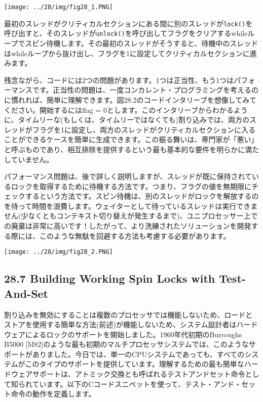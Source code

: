 \texttt{[image: ../28/img/fig28\_1.PNG]}

最初のスレッドがクリティカルセクションにある間に別のスレッドが\texttt{lock()}を呼び出すと、そのスレッドが\texttt{unlock()}を呼び出してフラグをクリアするwhileループでスピン待機します。その最初のスレッドがそうすると、待機中のスレッドはwhileループから抜け出し、フラグを1に設定してクリティカルセクションに進みます。

残念ながら、コードには2つの問題があります。1つは正当性、もう1つはパフォーマンスです。正当性の問題は、一度コンカレント・プログラミングを考えるのに慣れれば、簡単に理解できます。図28.2のコードインタリーブを想像してみてください。開始するにはflag
=
0とします。このインタリーブからわかるように、タイムリーな(もしくは、タイムリーではなくても)割り込みでは、両方のスレッドがフラグを1に設定し、両方のスレッドがクリティカルセクションに入ることができるケースを簡単に生成できます。この振る舞いは、専門家が「悪い」と呼ぶものであり、相互排除を提供するという最も基本的な要件を明らかに満たしていません。

パフォーマンス問題は、後で詳しく説明しますが、スレッドが既に保持されているロックを取得するために待機する方法です。つまり、フラグの値を無期限にチェックするという方法です。スピン待機は、別のスレッドがロックを解放するのを待って時間を浪費します。ウェイターとして待っているスレッドは実行できません(少なくともコンテキスト切り替えが発生するまで)、ユニプロセッサー上での廃棄は非常に高いです！したがって、より洗練されたソリューションを開発する際には、このような無駄を回避する方法も考慮する必要があります。

\texttt{[image: ../28/img/fig28\_2.PNG]}

\hypertarget{building-working-spin-locks-with-test-and-set}{%
\subsection*{28.7 Building Working Spin Locks with
Test-And-Set}\label{building-working-spin-locks-with-test-and-set}}

割り込みを無効にすることは複数のプロセッサでは機能しないため、ロードとストアを使用する簡単な方法(前述)が機能しないため、システム設計者はハードウェアによるロックのサポートを開始しました。1960年代初期のBurroughs
B5000
{[}M82{]}のような最も初期のマルチプロセッサシステムでは、このようなサポートがありました。今日では、単一のCPUシステムであっても、すべてのシステムがこのタイプのサポートを提供しています。理解するための最も簡単なハードウェアサポートは、アトミック交換とも呼ばれるテストアンドセット命令として知られています。以下のCコードスニペットを使って、テスト・アンド・セット命令の動作を定義します。

